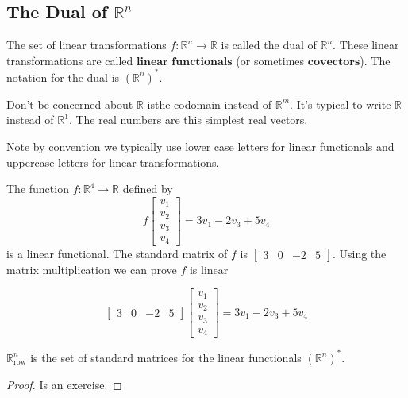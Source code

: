 \subsection{The Dual of $\mathbb{R}^n$}

\begin{definition}
The set of linear transformations $f:\mathbb{R}^n \to \mathbb{R}$ is called the dual of $\mathbb{R}^n$. These linear transformations are called $\textbf{linear functionals}$ (or sometimes $\textbf{covectors}$). The notation for the dual is $\left(\mathbb{R}^n\right)^*$.
\end{definition}

\begin{remark} Don't be concerned about $\mathbb{R}$ isthe codomain instead of $\mathbb{R}^m$. It's typical to write $\mathbb{R}$ instead of $\mathbb{R}^1$. The real numbers are this simplest real vectors.
\end{remark}

\begin{remark}Note by convention we typically use lower case letters for linear functionals and uppercase letters for linear transformations.
\end{remark}

\begin{example} The function $f:\mathbb{R}^4 \to \mathbb{R}$ defined by
\[
f\begin{bmatrix}v_1\\v_2\\v_3\\v_4\end{bmatrix}=3v_1-2v_3+5v_4
\]
is a linear functional. The standard matrix of $f$ is $\begin{bmatrix}3 & 0 & -2 &5 \end{bmatrix}$. Using the matrix multiplication we can prove $f$ is linear 

\[
\begin{bmatrix}3 & 0 & -2 &5 \end{bmatrix}\begin{bmatrix}v_1\\v_2\\v_3\\v_4\end{bmatrix}=3v_1-2v_3+5v_4
\]

\end{example}

\begin{theorem}
$\mathbb{R}^n_\text{row}$ is the set of standard matrices for the linear functionals $\left(\mathbb{R}^n\right)^*$.
\end{theorem}
\begin{proof}
Is an exercise.
\end{proof}

